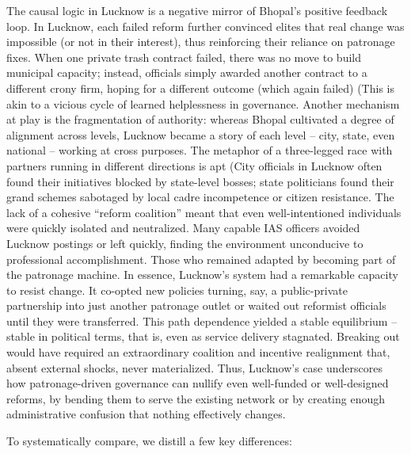 The causal logic in Lucknow is a negative mirror of Bhopal's positive feedback loop. In Lucknow, each failed reform further convinced elites that real change was impossible (or not in their interest), thus reinforcing their reliance on patronage fixes. When one private trash contract failed, there was no move to build municipal capacity; instead, officials simply awarded another contract to a different crony firm, hoping for a different outcome (which again failed) (This is akin to a vicious cycle of learned helplessness in governance. Another mechanism at play is the fragmentation of authority: whereas Bhopal cultivated a degree of alignment across levels, Lucknow became a story of each level – city, state, even national – working at cross purposes. The metaphor of a three-legged race with partners running in different directions is apt (City officials in Lucknow often found their initiatives blocked by state-level bosses; state politicians found their grand schemes sabotaged by local cadre incompetence or citizen resistance. The lack of a cohesive ``reform coalition'' meant that even well-intentioned individuals were quickly isolated and neutralized. Many capable IAS officers avoided Lucknow postings or left quickly, finding the environment unconducive to professional accomplishment. Those who remained adapted by becoming part of the patronage machine. In essence, Lucknow's system had a remarkable capacity to resist change. It co-opted new policies turning, say, a public-private partnership into just another patronage outlet or waited out reformist officials until they were transferred. This path dependence yielded a stable equilibrium – stable in political terms, that is, even as service delivery stagnated. Breaking out would have required an extraordinary coalition and incentive realignment that, absent external shocks, never materialized. Thus, Lucknow's case underscores how patronage-driven governance can nullify even well-funded or well-designed reforms, by bending them to serve the existing network or by creating enough administrative confusion that nothing effectively changes.

To systematically compare, we distill a few key differences:

